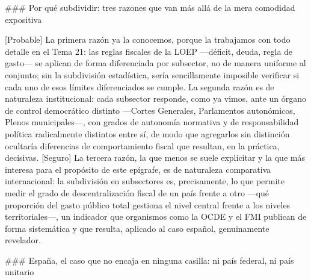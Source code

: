 \documentclass[10pt,a4paper]{article}
\begin{document}
### Por qué subdividir: tres razones que van más allá de la mera comodidad expositiva

[Probable] La primera razón ya la conocemos, porque la trabajamos con todo detalle en el Tema 21: las reglas fiscales de la LOEP —déficit, deuda, regla de gasto— se aplican de forma diferenciada por subsector, no de manera uniforme al conjunto; sin la subdivisión estadística, sería sencillamente imposible verificar si cada uno de esos límites diferenciados se cumple. La segunda razón es de naturaleza institucional: cada subsector responde, como ya vimos, ante un órgano de control democrático distinto —Cortes Generales, Parlamentos autonómicos, Plenos municipales—, con grados de autonomía normativa y de responsabilidad política radicalmente distintos entre sí, de modo que agregarlos sin distinción ocultaría diferencias de comportamiento fiscal que resultan, en la práctica, decisivas. [Seguro] La tercera razón, la que menos se suele explicitar y la que más interesa para el propósito de este epígrafe, es de naturaleza comparativa internacional: la subdivisión en subsectores es, precisamente, lo que permite medir el grado de descentralización fiscal de un país frente a otro —qué proporción del gasto público total gestiona el nivel central frente a los niveles territoriales—, un indicador que organismos como la OCDE y el FMI publican de forma sistemática y que resulta, aplicado al caso español, genuinamente revelador.

### España, el caso que no encaja en ninguna casilla: ni país federal, ni país unitario
\end{document}
